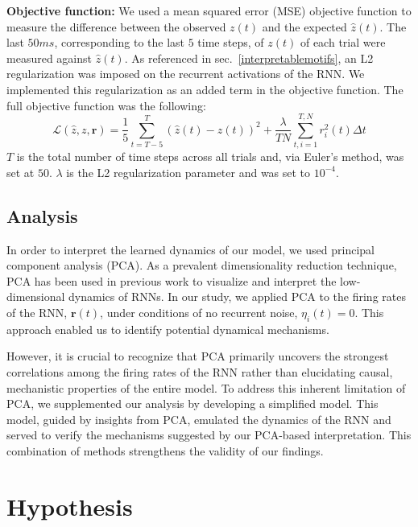 \documentclass[conference]{IEEEtran}
\begin{document}
\textbf{Objective function:} We used a mean squared error (MSE) objective function to measure the difference between the observed $z(t)$ and the expected $\hat{z}(t)$. The last $50 ms$, corresponding to the last $5$ time steps, of $z(t)$ of each trial were measured against $\hat{z}(t)$. As referenced in sec.~\ref{interpretablemotifs}, an L2 regularization was imposed on the recurrent activations of the RNN. We implemented this regularization as an added term in the objective function. The full objective function was the following:
\begin{equation}
    \mathcal{L}(\hat{z},z,\textbf{r}) = \frac{1}{5}\sum_{t=T-5}^{T}(\hat{z}(t)-z(t))^2 + \frac{\lambda}{TN} \sum_{t,i=1}^{T,N} r^2_i(t)\Delta t
\end{equation}
$T$ is the total number of time steps across all trials and, via Euler's method, was set at $50$. $\lambda$ is the L2 regularization parameter and was set to $10^{-4}$.

\subsection{Analysis}
\label{analysismodel}

In order to interpret the learned dynamics of our model, we used principal component analysis (PCA). As a prevalent dimensionality reduction technique, PCA has been used in previous work to visualize and interpret the low-dimensional dynamics of RNNs\cite{sussillo2013opening,mante2013context,driscoll2022flexible,kay2022neural,pals2023trained}. In our study, we applied PCA to the firing rates of the RNN, $\textbf{r}(t)$, under conditions of no recurrent noise, $\eta_i(t)=0$. This approach enabled us to identify potential dynamical mechanisms.

However, it is crucial to recognize that PCA primarily uncovers the strongest correlations among the firing rates of the RNN rather than elucidating causal, mechanistic properties of the entire model\cite{langdon2022latent}. To address this inherent limitation of PCA, we supplemented our analysis by developing a simplified model. This model, guided by insights from PCA, emulated the dynamics of the RNN and served to verify the mechanisms suggested by our PCA-based interpretation. This combination of methods strengthens the validity of our findings.

\section{Hypothesis}
\end{document}

